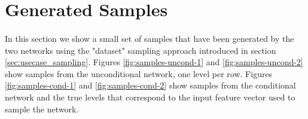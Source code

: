 \section{Generated Samples}
\label{sec:samples}
\paragraph{} In this section we show a small set of samples that have been generated by the two networks using the "dataset" sampling approach introduced in section \ref{sec:usecase_sampling}. Figures \ref{fig:samples-uncond-1} and \ref{fig:samples-uncond-2} show samples from the unconditional network, one level per row. Figures \ref{fig:samples-cond-1} and \ref{fig:samples-cond-2} show samples from the conditional network and the true levels that correspond to the input feature vector used to sample the network. 
